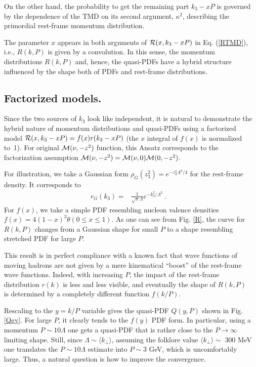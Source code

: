 On the other hand, the probability to get the remaining part $k_3-xP$
is governed by the dependence of the TMD on its second argument,
$\kappa^2$,
describing the primordial
rest-frame
momentum distribution.

The parameter $x$ appears in both arguments of
${\cal R} (x, k_3-xP)$ in Eq. (\ref{RTMD}),
i.e., $R(k,P)$ is given by a convolution.
In this sense, the momentum distributions $R(k,P)$
and, hence, the quasi-PDFs have a hybrid structure influenced by
the shape both of
PDFs and rest-frame distributions.

\subsection{Factorized models.}

Since the two sources of $k_3$ look like independent, it is natural
to demonstrate the hybrid nature of momentum distributions and quasi-PDFs using
a factorized model \mbox{${\cal R} (x, k_3-xP) = f(x) r (k_3-xP)$}
(the $x$ integral of $f(x)$ is normalized \mbox{to 1).}
For original ${\cal M} (\nu,-z^2)$ function, this Ansatz corresponds
to the factorization assumption ${\cal M} (\nu,-z^2) = {\cal M} (\nu,0){\cal M} (0,-z^2)$.

For illustration, we take a Gaussian form
$
\rho_G(z_3^2)=  e^{-z_3^2\Lambda^2/4}
$ for the rest-frame density. It corresponds to
\begin{align}
r_G(k_3) =  &
\frac{1}{\sqrt{\pi } \Lambda}  e^{-k_3^2/\Lambda^2}
\  .
\label{DTMDsmallfac}
\end{align}
For $f(x)$, we take
a simple PDF resembling nucleon valence densities
$f(x)=4(1-x)^3 \theta (0\leq x \leq 1)$.
As one can see from Fig. \ref{R}, the curve for $R(k,P)$
changes from a Gaussian shape for small $P$ to a shape resembling
stretched PDF for large $P$.

This result is in perfect compliance
with a known fact that wave functions
of moving hadrons are not given by a mere kinematical ``boost''
of the rest-frame wave functions.
Indeed, with increasing $P$, the impact of the
rest-frame distribution $r(k)$
is less and less visible, and eventually the shape of
$R(k,P)$ is determined by a completely
different function $f(k/P)$.

Rescaling to the $y=k/P$ variable
gives the quasi-PDF $Q(y,P)$ shown in Fig. \ref{Qgy}.
For large $P$, it clearly tends to the $f(y)$ PDF form.
In particular, using a momentum
$P \sim 10 \Lambda$ one gets a quasi-PDF that is rather close to the $P \to \infty$ limiting shape.
Still, since $\Lambda \sim \langle k_\perp \rangle$, assuming the folklore value
$\langle k_\perp \rangle \sim $ 300 MeV one translates the
\mbox{$P\sim 10 \Lambda$} estimate into $P \sim 3$ GeV,
which is uncomfortably large. Thus, a natural question is how to improve the convergence.

